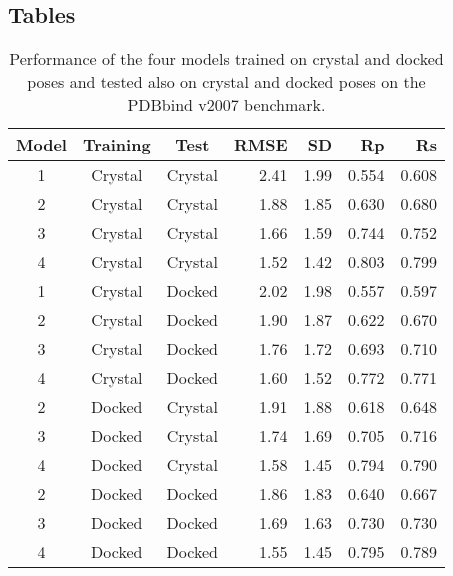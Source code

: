 \documentclass[twocolumn]{bmcart}
\begin{document}
\begin{backmatter}
\section*{Tables}

\begin{table}[ht]
\caption{Performance of the four models trained on crystal and docked poses and tested also on crystal and docked poses on the PDBbind v2007 benchmark.}
\label{rfscore4:tbl-set-1-pdbbind-2007}
\begin{tabular}{cccrrrr}
\hline
Model & Training & Test & RMSE & SD & Rp & Rs\\
\hline
1 & Crystal & Crystal & 2.41 & 1.99 & 0.554 & 0.608\\
2 & Crystal & Crystal & 1.88 & 1.85 & 0.630 & 0.680\\
3 & Crystal & Crystal & 1.66 & 1.59 & 0.744 & 0.752\\
4 & Crystal & Crystal & 1.52 & 1.42 & 0.803 & 0.799\\
\hline
1 & Crystal & Docked  & 2.02 & 1.98 & 0.557 & 0.597\\
2 & Crystal & Docked  & 1.90 & 1.87 & 0.622 & 0.670\\
3 & Crystal & Docked  & 1.76 & 1.72 & 0.693 & 0.710\\
4 & Crystal & Docked  & 1.60 & 1.52 & 0.772 & 0.771\\
\hline
2 & Docked  & Crystal & 1.91 & 1.88 & 0.618 & 0.648\\
3 & Docked  & Crystal & 1.74 & 1.69 & 0.705 & 0.716\\
4 & Docked  & Crystal & 1.58 & 1.45 & 0.794 & 0.790\\
\hline
2 & Docked  & Docked  & 1.86 & 1.83 & 0.640 & 0.667\\
3 & Docked  & Docked  & 1.69 & 1.63 & 0.730 & 0.730\\
4 & Docked  & Docked  & 1.55 & 1.45 & 0.795 & 0.789\\
\hline
\end{tabular}
\end{table}


\end{backmatter}
\end{document}

